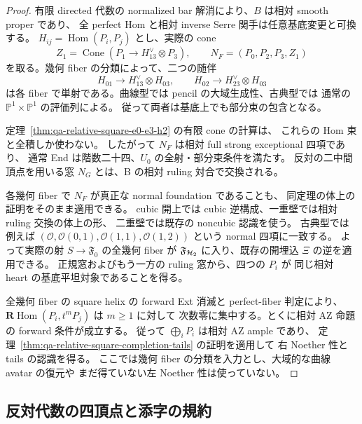 \begin{proof}
有限 directed 代数の normalized bar 解消により、$B$ は相対 smooth proper であり、
全 perfect Hom と相対 inverse Serre 関手は任意基底変更と可換する。
$H_{ij}=\operatorname{Hom}(P_i,P_j)$ とし、実際の cone
\[
 Z_1=\operatorname{Cone}(P_1\to H_{13}^{\vee}\otimes P_3),\qquad
 N_F=(P_0,P_2,P_3,Z_1)
\]
を取る。幾何 fiber の分類によって、二つの随伴
\[
 H_{01}\longrightarrow H_{13}^{\vee}\otimes H_{03},\qquad
 H_{02}\longrightarrow H_{23}^{\vee}\otimes H_{03}
\]
は各 fiber で単射である。曲線型では pencil の大域生成性、古典型では
通常の $\mathbb P^1\times\mathbb P^1$ の評価列による。
従って両者は基底上でも部分束の包含となる。

定理~\ref{thm:qa-relative-square-e0-e3-h2} の有限 cone の計算は、
これらの Hom 束と全積しか使わない。
したがって $N_F$ は相対 full strong exceptional 四項であり、
通常 End は階数二十四、$U_0$ の全射・部分束条件を満たす。
反対の二中間頂点を用いる窓 $N_G$ とは、B の相対 ruling 対合で交換される。

各幾何 fiber で $N_F$ が真正な normal foundation であることも、
同定理の体上の証明をそのまま適用できる。
cubic 開上では cubic 逆構成、一重壁では相対 ruling 交換の体上の形、
二重壁では既存の noncubic 認識を使う。
古典型では例えば
$(\mathcal O,\mathcal O(0,1),\mathcal O(1,1),\mathcal O(1,2))$
という normal 四項に一致する。
よって実際の射 $S\to\mathfrak F_0$ の全幾何 fiber が
$\mathfrak F_{\mathcal H_2}$ に入り、既存の開埋込 $\Xi$ の逆を適用できる。
正規窓およびもう一方の ruling 窓から、四つの $P_i$ が
同じ相対 heart の基底平坦対象であることを得る。

全幾何 fiber の square helix の forward Ext 消滅と perfect-fiber 判定により、
$\mathbf R\operatorname{Hom}(P_i,t^mP_j)$ は $m\geq1$ に対して
次数零に集中する。とくに相対 AZ 命題の forward 条件が成立する。
従って $\bigoplus_iP_i$ は相対 AZ ample であり、
定理~\ref{thm:qa-relative-square-completion-tails} の証明を適用して
右 Noether 性と tails の認識を得る。
ここでは幾何 fiber の分類を入力とし、大域的な曲線 avatar の復元や
まだ得ていない左 Noether 性は使っていない。
\end{proof}

\subsection{反対代数の四頂点と添字の規約}

